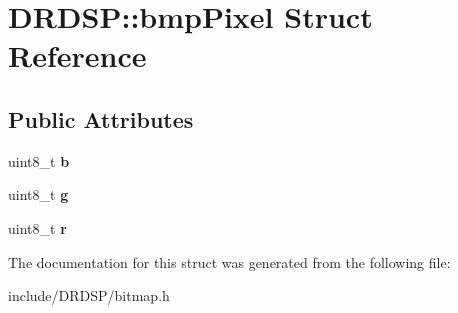 \hypertarget{struct_d_r_d_s_p_1_1bmp_pixel}{\section{D\-R\-D\-S\-P\-:\-:bmp\-Pixel Struct Reference}
\label{struct_d_r_d_s_p_1_1bmp_pixel}
}
\subsection*{Public Attributes}
\begin{DoxyCompactItemize}
\item 
\hypertarget{struct_d_r_d_s_p_1_1bmp_pixel_a3acbed236a5f85a3eff2b441c3c468bb}{uint8\-\_\-t {\bfseries b}}\label{struct_d_r_d_s_p_1_1bmp_pixel_a3acbed236a5f85a3eff2b441c3c468bb}

\item 
\hypertarget{struct_d_r_d_s_p_1_1bmp_pixel_ae857487a30299f0baff0bb655079f4d8}{uint8\-\_\-t {\bfseries g}}\label{struct_d_r_d_s_p_1_1bmp_pixel_ae857487a30299f0baff0bb655079f4d8}

\item 
\hypertarget{struct_d_r_d_s_p_1_1bmp_pixel_a71473aa1faa5bc011d75eb3063a1e4da}{uint8\-\_\-t {\bfseries r}}\label{struct_d_r_d_s_p_1_1bmp_pixel_a71473aa1faa5bc011d75eb3063a1e4da}

\end{DoxyCompactItemize}


The documentation for this struct was generated from the following file\-:\begin{DoxyCompactItemize}
\item 
include/\-D\-R\-D\-S\-P/bitmap.\-h\end{DoxyCompactItemize}
